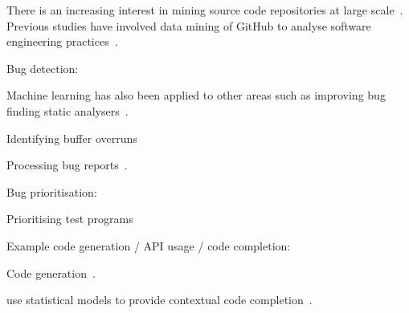 There is an increasing interest in mining source code repositories at large scale~\cite{Allamanis2013a,White2015a,Bird2009}. Previous studies have involved data mining of GitHub to analyse software engineering practices~\cite{Wu2014,Guzman2014,Baishakhi2014a,Vasilescu2015}.



Bug detection:

Machine learning has also been applied to other areas such as improving bug finding static analysers~\cite{Heo2017,Koc2017}.

Identifying buffer overruns~\cite{Choi2016}

Processing bug reports~\cite{Lam2016,Huo2016}.






Bug prioritisation:

Prioritising test programs~\cite{Chen2017}

Example code generation / API usage / code completion:

Code generation~\cite{Zhang2015a}.

\citeauthor{Raychev2014} use statistical models to provide contextual code completion~\cite{Raychev2014}.

